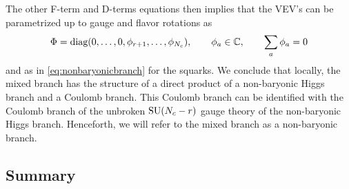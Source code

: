         The other F-term and D-terms equations then implies that the VEV's can be parametrized up to gauge and flavor rotations as
        \begin{equation}
            \Phi=\text{diag}(0,\dots,0,\phi_{r+1},\dots,\phi_{N_c}),\qquad \phi_a\in\mathbb{C},\qquad\sum_a\phi_a=0
        \end{equation}
        and as in \eqref{eq:nonbaryonicbranch} for the squarks. We conclude that locally, the mixed branch has the structure of a direct product of a non-baryonic Higgs branch and a Coulomb branch. This Coulomb branch can be identified with the Coulomb branch of the unbroken $\text{SU}(N_c-r)$ gauge theory of the non-baryonic Higgs branch. Henceforth, we will refer to the mixed branch as a non-baryonic branch.

    \subsection{Summary}

